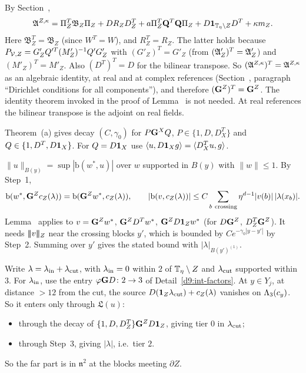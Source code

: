 \begin{detail}\label{d9:cut-term}
\begin{step}
By Section~,
\[
\mathfrak A^{Z,\kappa}=\Pi_Z^T\mathfrak B_Z\Pi_Z+DR_ZD^T_Z+a\Pi_Z^T\mathbf Q^T\mathbf Q\Pi_Z+D\mathbf 1_{\mathbb T_\eta\setminus Z}D^T+\kappa m_Z .
\]
Here $\mathfrak B_Z^T=\mathfrak B_Z$ (since $W^T=W$), and $R_Z^T=R_Z$. The latter holds because $P_{\mathcal V,Z}=G'_ZQ'^T(M'_Z)^{-1}Q'G'_Z$ with $(G'_Z)^T=G'_Z$ (from $(\mathfrak A'_Z)^T=\mathfrak A'_Z$) and $(M'_Z)^T=M'_Z$. Also $(D^T)^T=D$ for the bilinear transpose. So $(\mathfrak A^{Z,\kappa})^T=\mathfrak A^{Z,\kappa}$ as an algebraic identity, at real and at complex references (Section~, paragraph ``Dirichlet conditions for all components''), and therefore $(\mathbf G^Z)^T=\mathbf G^Z$. The identity theorem invoked in the proof of Lemma~ is not needed. At real references the bilinear transpose is the adjoint on real fields.
\end{step}
\begin{step}[$L^2$ input]
Theorem~(a) gives decay $(C,\gamma_0)$ for $P\mathbf G^XQ$, $P\in\{1,D,D^T_X\}$ and $Q\in\{1,D^T,D\mathbf 1_X\}$. For $Q=D\mathbf 1_X$ use $\langle u,D\mathbf 1_Xg\rangle=\langle D^T_Xu,g\rangle$.
\end{step}
\begin{step}
$\|u\|_{B(y)}=\sup|\mathrm b(w^*,u)|$ over $w$ supported in $B(y)$ with $\|w\|\le1$. By Step~1,
\[
\mathrm b(w^*,\mathbf G^Zc_Z(\lambda))=\mathrm b(\mathbf G^Zw^*,c_Z(\lambda)),\qquad|\mathrm b(v,c_Z(\lambda))|\le C\sum_{b\ \rm crossing}\eta^{d-1}|v(b)|\,|\lambda(x_b)| .
\]
Lemma~ applies to $v=\mathbf G^Zw^*$, $\mathbf G^ZD^Tw^*$, $\mathbf G^ZD\mathbf 1_Zw^*$ (for $D\mathbf G^Z$, $D^T_Z\mathbf G^Z$). It needs $|\!|\!|v|\!|\!|_Z$ near the crossing blocks $y'$, which is bounded by $Ce^{-\gamma_0|y-y'|}$ by Step~2. Summing over $y'$ gives the stated bound with $|\lambda|_{B(y')^{(1)}}$.
\end{step}
\begin{step}
Write $\lambda=\lambda_{\rm in}+\lambda_{\rm cut}$, with $\lambda_{\rm in}=0$ within $2$ of $\mathbb T_\eta\setminus Z$ and $\lambda_{\rm cut}$ supported within $3$. For $\lambda_{\rm in}$, use the entry $\varphi\mathbf G D\colon2\to3$ of Detail~\ref{d9:int-factors}. At $y\in Y_j$, at distance $>12$ from the cut, the source $D(\mathbf 1_Z\lambda_{\rm cut})+c_Z(\lambda)$ vanishes on $\Lambda_3(c_y)$. So it enters only through $\mathfrak L(u)$:
\begin{itemize}
\item through the decay of $\{1,D,D^T_Z\}\mathbf G^ZD\mathbf 1_Z$, giving tier $0$ in $\lambda_{\rm cut}$;
\item through Step~3, giving $|\lambda|$, i.e.\ tier $2$.
\end{itemize}
So the far part is in $\mathfrak n^2$ at the blocks meeting $\partial Z$.
\end{step}
\end{detail}

